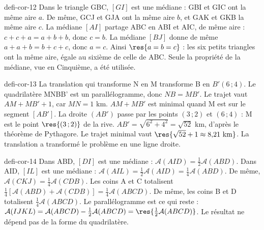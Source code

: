\begin{blocEdition}{defi-cor-12}
Dans le triangle GBC, $[GI]$ est une médiane : GBI et GIC ont la même aire $a$. De même, GCJ et GJA ont la même aire $b$, et GAK et GKB la même aire $c$.
La médiane $[AI]$ partage ABC en ABI et AIC, de même aire : $c+c+a=a+b+b$, donc $c=b$. La médiane $[BJ]$ donne de même $a+a+b=b+c+c$, donc $a=c$.
Ainsi $\res{a=b=c}$ : les six petits triangles ont la même aire, égale au sixième de celle de ABC. Seule la propriété de la médiane, vue en Cinquième, a été utilisée.\label{fig-defi-cor-12}

\end{blocEdition}
\begin{blocEdition}{defi-cor-13}
La translation qui transforme N en M transforme B en $B'(6\,;4)$. Le quadrilatère MNBB’ est un parallélogramme, donc $NB=MB'$. Le trajet vaut $AM+MB'+1$, car $MN=1$ km.
$AM+MB'$ est minimal quand M est sur le segment $[AB']$. La droite $(AB')$ passe par les points $(3\,;2)$ et $(6\,;4)$ : M est le point $\res{(3\,;2)}$ de la rive.
$AB'=\sqrt{6^2+4^2}=\sqrt{52}$ km, d’après le théorème de Pythagore. Le trajet minimal vaut $\res{\sqrt{52}+1\approx8{,}21\ \mathrm{km}}$. La translation a transformé le problème en une ligne droite.\label{fig-defi-cor-13}

\end{blocEdition}
\begin{blocEdition}{defi-cor-14}
Dans ABD, $[DI]$ est une médiane : $\mathcal A(AID)=\frac12\mathcal A(ABD)$. Dans AID, $[IL]$ est une médiane : $\mathcal A(AIL)=\frac12\mathcal A(AID)=\frac14\mathcal A(ABD)$. De même, $\mathcal A(CKJ)=\frac14\mathcal A(CDB)$.
Les coins A et C totalisent $\frac14\left[\mathcal A(ABD)+\mathcal A(CDB)\right]=\frac14\mathcal A(ABCD)$. De même, les coins B et D totalisent $\frac14\mathcal A(ABCD)$.
Le parallélogramme est ce qui reste : $\mathcal A(IJKL)=\mathcal A(ABCD)-\frac12\mathcal A(ABCD)=\res{\frac12\mathcal A(ABCD)}$. Le résultat ne dépend pas de la forme du quadrilatère.\label{fig-defi-cor-14}

\end{blocEdition}
